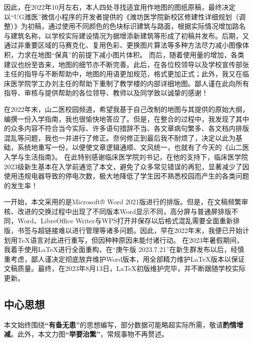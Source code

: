 因此，在2022年10月左右，本人四处寻找适宜用作地图的图纸原稿，最终决定以“UG潍医”微信小程序的开发者提供的《潍坊医学院新校区修建性详细规划（调整）》为初稿，通过使用不同颜色的色块标识建筑与路面，根据实际情况增加路名与建筑名称，以学校实际建设情况为据增添新建筑等形成了初稿并发布\footnotemark。后期，又通过非重要区域的马赛克化、复用色彩、更换图片算法等多种方法尽力减小图像体积，力求在地图“保真”的前提下减小图片体积。
而后，随着使用量的增加，各类建议也纷至沓来，地图的细节亦不断完善。此后，在各位校领导以及学校宣传部张主任的指导与不断帮助中，地图的用语更加规范，格式更加正式；此外，我又在临床医学院学工办刘主任的帮助下重制了教学楼的内部详细地图。鄙人谨在此向所有指导、审核与提供帮助的各位领导、教师以及同学致以诚挚的感谢！

在2022年末，山二医校园频道\footnotemark，希望我基于自己改制的地图与其提供的原始大纲，编撰一份入学指南，我也很愉快地答应了。但是，在整合的过程中，我发现了其中的众多内容不符合当今实际、许多语句措辞不当、各文章病句繁多、各文档内排版混乱等问题，我也一并进行了修正。奈何修正到最后我不耐烦了，决定以此为基础，系统地重写一份，以便使文章逻辑通顺、文风统一，也就有了今天的《山二医入学与生活指南》\footnotemark。
在此特别感谢临床医学院刘书记，在他的支持下，临床医学院2023级新生基本在入学前通览了本文，避免了众多常见错误的再犯，显著减少了因使用违规电器导致的停电次数，极大地降低了学生因不熟悉校园而产生的各类问题的发生率！

一开始，本文采用的是Microsoft® Word 2021版进行的排版。但是，在文稿频繁审核、改进的交换过程中出现了不同版本Word显示不同，高分屏与普通屏排版不同，Word、LibreOffice Writer与WPS打开并保存以后格式混乱需要全面重新排版，书签与超链接难以进行管理等诸多问题。因此，早在2022年末，我便已开始计划用\TeX 语言对此进行重写，但因种种原因未能付诸行动。
在2023年暑假期间，我着手使用\LaTeX 进行全面重构，在“庚午版 2023.7.21”在新生群发布以后，经慎重考虑，鄙人谨决定彻底放弃维护Word版本\footnotemark，用全部精力维护\LaTeX 版本以保证文稿质量。最终，在2023年8月13日，\LaTeX 初版维护完毕，并不断跟随学校实际更新。

\subsection[中心思想]{中心思想}
本文始终围绕\textbf{“有备无患”}的思想编写，部分数据可能略超实际所需，敬请\textbf{酌情增减}。此外，本文力图\textbf{“举要治繁”}，常规事物不再赘述。

